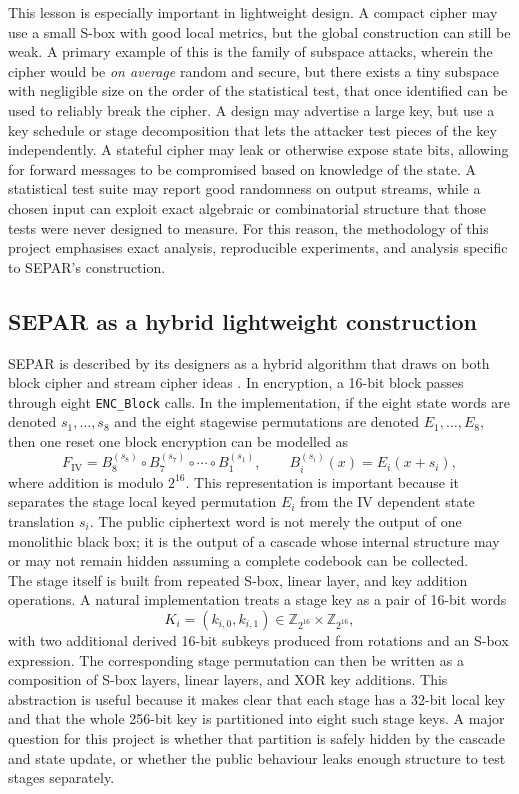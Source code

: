\documentclass[11pt]{article}
\newcommand{\Z}[1]{\mathbb{Z}_{#1}}
\begin{document}
This lesson is especially important in lightweight design. A compact cipher may use a small S-box with good local metrics, but the global construction can still be weak. A primary example of this is the family of subspace attacks, wherein the cipher would be \textit{on average} random and secure, but there exists a tiny subspace with negligible size on the order of the statistical test, that once identified can be used to reliably break the cipher. A design may advertise a large key, but use a key schedule or stage decomposition that lets the attacker test pieces of the key independently. A stateful cipher may leak or otherwise expose state bits, allowing for forward messages to be compromised based on knowledge of the state. A statistical test suite may report good randomness on output streams, while a chosen input can exploit exact algebraic or combinatorial structure that those tests were never designed to measure. For this reason, the methodology of this project emphasises exact analysis, reproducible experiments, and analysis specific to SEPAR's construction.\\

\subsection{SEPAR as a hybrid lightweight construction}

SEPAR is described by its designers as a hybrid algorithm that draws on both block cipher and stream cipher ideas \cite{VahiJassbi2020}. In encryption, a 16-bit block passes through eight \texttt{ENC\_Block} calls. In the implementation, if the eight state words are denoted $s_1,\ldots,s_8$ and the eight stagewise permutations are denoted $E_1,\ldots,E_8$, then one reset one block encryption can be modelled as
\[
F_{\mathrm{IV}}
=B_8^{(s_8)}\circ B_7^{(s_7)}\circ \cdots \circ B_1^{(s_1)},
\qquad
B_i^{(s_i)}(x)=E_i(x+s_i),
\]
where addition is modulo $2^{16}$. This representation is important because it separates the stage local keyed permutation $E_i$ from the IV dependent state translation $s_i$. The public ciphertext word is not merely the output of one monolithic black box; it is the output of a cascade whose internal structure may or may not remain hidden assuming a complete codebook can be collected.\\

The stage itself is built from repeated S-box, linear layer, and key addition operations. A natural implementation treats a stage key as a pair of 16-bit words
\[
K_i=(k_{i,0},k_{i,1})\in \Z{2^{16}}\times\Z{2^{16}},
\]
with two additional derived 16-bit subkeys produced from rotations and an S-box expression. The corresponding stage permutation can then be written as a composition of S-box layers, linear layers, and XOR key additions. This abstraction is useful because it makes clear that each stage has a 32-bit local key and that the whole 256-bit key is partitioned into eight such stage keys. A major question for this project is whether that partition is safely hidden by the cascade and state update, or whether the public behaviour leaks enough structure to test stages separately.\\
\end{document}
